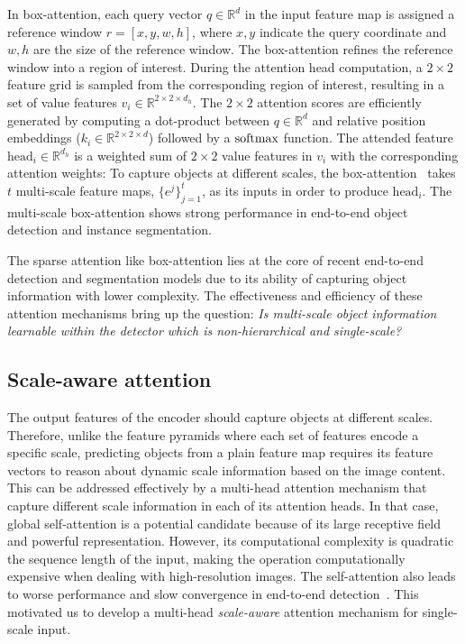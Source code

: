 In box-attention, each query vector $q \in \mathbb{R}^d$ in the input feature map is assigned a reference window $r {=} [x, y, w, h]$, where $x, y$ indicate the query coordinate and $w, h$ are the size of the reference window. The box-attention refines the reference window into a region of interest.
During the attention head computation, a $2 {\times} 2$ feature grid is sampled from the corresponding region of interest, resulting in a set of value features $v_i \in \mathbb{R}^{2 \times 2 \times d_h}$. The $2 {\times} 2$ attention scores are efficiently generated by computing a dot-product between $q \in \mathbb{R}^d$ and relative position embeddings ($k_i \in \mathbb{R}^{2 \times 2 \times d}$) followed by a $\mathrm{softmax}$ function. The attended feature $\mathrm{head}_i \in \mathbb{R}^{d_h}$ is a weighted sum of $2 {\times} 2$ value features in $v_i$ with the corresponding attention weights:
%
%
To capture objects at different scales, the box-attention~\cite{nguyen2022boxer} takes $t$ multi-scale feature maps, $\{e^j\}_{j=1}^t$, as its inputs in order to produce $\mathrm{head}_i$. The multi-scale box-attention shows strong performance in end-to-end object detection and instance segmentation.

The sparse attention like box-attention lies at the core of recent end-to-end detection and segmentation models due to its ability of capturing object information with lower complexity. The effectiveness and efficiency of these attention mechanisms bring up the question: \textit{Is multi-scale object information learnable within the detector which is non-hierarchical and single-scale?}

\subsection{Scale-aware attention}

The output features of the encoder should capture objects at different scales. Therefore, unlike the feature pyramids where each set of features encode a specific scale, predicting objects from a plain feature map requires its feature vectors to reason about dynamic scale information based on the image content. This can be addressed effectively by a multi-head attention mechanism that capture different scale information in each of its attention heads. 
In that case, global self-attention is a potential candidate because of its large receptive field and powerful representation. However, its computational complexity is quadratic \wrt the sequence length of the input, making the operation computationally expensive when dealing with high-resolution images. The self-attention also leads to worse performance and slow convergence in end-to-end detection~\cite{zhu2021deformable}. This motivated us to develop a multi-head \emph{scale-aware} attention mechanism for single-scale input.

